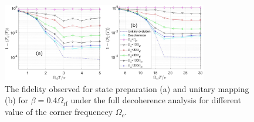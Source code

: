 \documentclass[aps,prl,onecolumn,reprint,superscriptaddress]{revtex4}
\begin{document}
\begin{figure}
\includegraphics[width=0.8\textwidth]{band_lim.eps}
\caption{The fidelity observed for state preparation (a) and unitary mapping (b) for $\beta=0.4\Omega_{\mathrm{rf}}$ under the full decoherence analysis for different value of the corner frequencey $\Omega_c$.  }
\label{fig:control_waveform_convolution_fidleity}
\end{figure}


\end{document}
